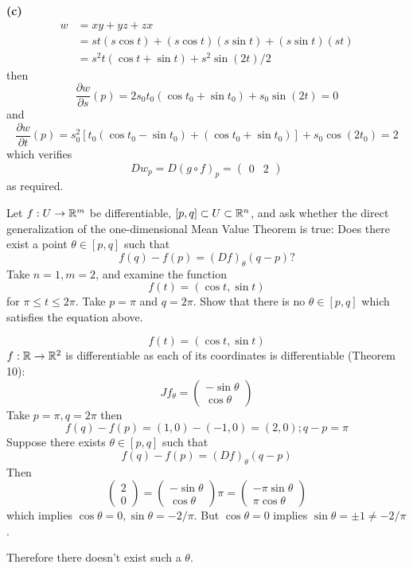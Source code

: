 \documentclass[a4paper, 12pt]{article}
\begin{document}
\begin{solution}
    \textbf{(c)}
    \begin{align*}
        w & = xy + yz + zx                                           \\
          & = st (s \cos t) + (s \cos t)(s \sin t) + (s \sin t) (st) \\
          & = s^2 t (\cos t + \sin t) + s^2 \sin(2t)/2
    \end{align*}
    then \[
        \frac{\partial w}{\partial s}(p) = 2s_0t_0(\cos t_0 + \sin t_0) + s_0 \sin(2t) = 0
    \]
    and \[
        \frac{\partial w}{\partial t}(p) = s_0^2[t_0(\cos t_0 - \sin t_0) + (\cos t_0 + \sin t_0)] + s_0 \cos(2 t_0) = 2
    \]
    which verifies \[
        Dw_p = D(g \circ f)_p = \begin{pmatrix}
            0 & 2
        \end{pmatrix}
    \]
    as required.
\end{solution}

\begin{problem} 
Let $f: U \to \mathbb{R}^m$ be differentiable, $[p, q] \subset U \subset \mathbb{R}^n$, and ask whether the direct generalization of the one-dimensional Mean Value Theorem is true: Does there exist a point $\theta \in [p, q]$ such that \[
    f(q) - f(p) = (Df)_\theta (q-p)?
\]
Take $n = 1, m=2$, and examine the function \[
    f(t) = (\cos t, \sin t)
\]
for $\pi \leq t \leq 2\pi$. Take $p = \pi$ and $q = 2\pi$. Show that there is no $\theta \in [p, q]$ which satisfies the equation above.
\end{problem}
\begin{solution}
    \[
        f(t) = (\cos t, \sin t)
    \]
    $f: \mathbb{R} \to \mathbb{R}^2$ is differentiable as each of its coordinates is differentiable (Theorem 10):
    \[
        Jf_\theta = \begin{pmatrix}
            -\sin \theta \\
            \cos \theta
        \end{pmatrix}
    \]
    Take $p = \pi, q = 2\pi$ then \[
        f(q) - f(p) = (1, 0) - (-1, 0) = (2, 0); q - p = \pi
    \]
    Suppose there exists $\theta \in [p, q]$ such that \[
        f(q) - f(p) = (Df)_\theta (q- p)
    \]
    Then \[
        \begin{pmatrix}
            2 \\0
        \end{pmatrix} = \begin{pmatrix}
            -\sin \theta \\
            \cos \theta
        \end{pmatrix} \pi = \begin{pmatrix}
            -\pi\sin \theta \\
            \pi\cos \theta
        \end{pmatrix}
    \]
    which implies $\cos \theta = 0, \sin \theta = -2/\pi$. But $\cos \theta = 0$ implies $\sin \theta = \pm 1 \neq -2/\pi$. \contra

    Therefore there doesn't exist such a $\theta$.
\end{solution}
\end{document}
